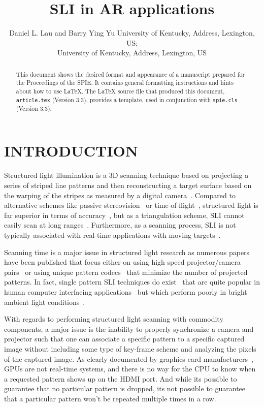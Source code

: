 \documentclass[]{spie}  %
\title{SLI in AR applications}
\author{Daniel L. Lau\supit{a} and Barry Ying Yu\supit{b}
\skiplinehalf
\supit{a}University of Kentucky, Address, Lexington, US; \\
\supit{b}University of Kentucky, Address, Lexington, US
}
\begin{document}
 
  \maketitle 

\begin{abstract}
This document shows the desired format and appearance of a manuscript prepared for the Proceedings of the SPIE.  It contains general formatting instructions and hints about how to use LaTeX.  The LaTeX source file that produced this document, {\tt article.tex} (Version 3.3), provides a template, used in conjunction with {\tt spie.cls} (Version 3.3).  
\end{abstract}



\section{INTRODUCTION}
\label{sec:intro}  %
Structured light illumination is a 3D scanning technique based on projecting a series of striped line patterns and then reconstructing a target surface based on the warping of the stripes as measured by a digital camera~\cite{otoo16}.  Compared to alternative schemes like passive stereovision~\cite{otoo16} or time-of-flight~\cite{otoo16}, structured light is far superior in terms of accuracy~\cite{otoo16}, but as a triangulation scheme, SLI cannot easily scan at long ranges~\cite{otoo16}.  Furthermore, as a scanning process, SLI is not typically associated with real-time applications with moving targets~\cite{otoo16}.

Scanning time is a major issue in structured light research as numerous papers have been published that focus either on using high speed projector/camera pairs~\cite{otoo16} or using unique pattern codecs~\cite{otoo16,otoo16,otoo16} that minimize the number of projected patterns. In fact, single pattern SLI techniques do exist~\cite{otoo16,otoo16,otoo16} that are quite popular in human computer interfacing applications~\cite{otoo16} but which perform poorly in bright ambient light conditions~\cite{otoo16}. 

With regards to performing structured light scanning with commodity components, a major issue is the inability to properly synchronize a camera and projector such that one can associate a specific pattern to a specific captured image without including some type of key-frame scheme and analyzing the pixels of the captured image. As clearly documented by graphics card manufacturers~\cite{otoo16}, GPUs are not real-time systems, and there is no way for the CPU to know when a requested pattern shows up on the HDMI port. And while its possible to guarantee that no particular pattern is dropped, its not possible to guarantee that a particular pattern won't be repeated multiple times in a row.
\end{document}
